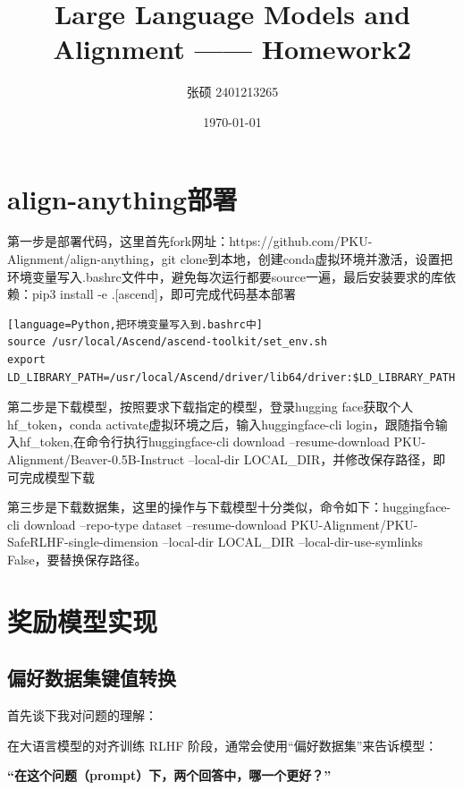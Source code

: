 \documentclass{article}
\title{Large Language Models and Alignment —— Homework2}
\author{张硕 2401213265}
\date{\today}
\begin{document}
\maketitle


\section{align-anything部署}
第一步是部署代码，这里首先fork网址：https://github.com/PKU-Alignment/align-anything，git clone到本地，创建conda虚拟环境并激活，设置把环境变量写入.bashrc文件中，避免每次运行都要source一遍，最后安装要求的库依赖：pip3 install -e .[ascend]，即可完成代码基本部署
\begin{lstlisting}[language=Python,把环境变量写入到.bashrc中]
source /usr/local/Ascend/ascend-toolkit/set_env.sh
export LD_LIBRARY_PATH=/usr/local/Ascend/driver/lib64/driver:$LD_LIBRARY_PATH
\end{lstlisting}

第二步是下载模型，按照要求下载指定的模型，登录hugging face获取个人hf\_token，conda activate虚拟环境之后，输入huggingface-cli login，跟随指令输入hf\_token,在命令行执行huggingface-cli download --resume-download PKU-Alignment/Beaver-0.5B-Instruct --local-dir LOCAL_DIR，并修改保存路径，即可完成模型下载

第三步是下载数据集，这里的操作与下载模型十分类似，命令如下：huggingface-cli download --repo-type dataset --resume-download PKU-Alignment/PKU-SafeRLHF-single-dimension --local-dir LOCAL\_DIR --local-dir-use-symlinks False，要替换保存路径。


\section{奖励模型实现}
\subsection{偏好数据集键值转换}
首先谈下我对问题的理解：

在大语言模型的对齐训练 RLHF 阶段，通常会使用“偏好数据集”来告诉模型：

\textbf{“在这个问题（prompt）下，两个回答中，哪一个更好？”}
\end{document}
